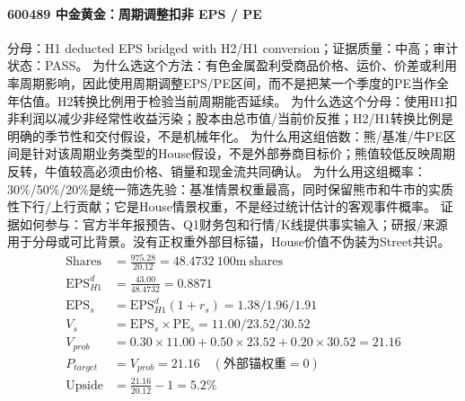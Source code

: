\paragraph{600489 中金黄金：周期调整扣非 EPS / PE}
分母：H1 deducted EPS bridged with H2/H1 conversion；证据质量：中高；审计状态：PASS。
为什么选这个方法：有色金属盈利受商品价格、运价、价差或利用率周期影响，因此使用周期调整EPS/PE区间，而不是把某一个季度的PE当作全年估值。H2转换比例用于检验当前周期能否延续。
为什么选这个分母：使用H1扣非利润以减少非经常性收益污染；股本由总市值/当前价反推；H2/H1转换比例是明确的季节性和交付假设，不是机械年化。
为什么用这组倍数：熊/基准/牛PE区间是针对该周期业务类型的House假设，不是外部券商目标价；熊值较低反映周期反转，牛值较高必须由价格、销量和现金流共同确认。
为什么用这组概率：30\%/50\%/20\%是统一筛选先验：基准情景权重最高，同时保留熊市和牛市的实质性下行/上行贡献；它是House情景权重，不是经过统计估计的客观事件概率。
证据如何参与：官方半年报预告、Q1财务包和行情/K线提供事实输入；研报/来源用于分母或可比背景。没有正权重外部目标锚，House价值不伪装为Street共识。
\begin{align*}
\mathrm{Shares} &= \frac{975.28}{20.12}=48.4732\ \mathrm{100m\ shares}\\
\mathrm{EPS}_{H1}^d &= \frac{43.00}{48.4732}=0.8871\\
\mathrm{EPS}_s &= \mathrm{EPS}_{H1}^d(1+r_s)=1.38/1.96/1.91\\
V_s &= \mathrm{EPS}_s\times \mathrm{PE}_s=11.00/23.52/30.52\\
V_{prob} &= 0.30\times 11.00+0.50\times 23.52+0.20\times 30.52=21.16\\
P_{target} &= V_{prob}=21.16\quad(\text{外部锚权重}=0)\\
\mathrm{Upside} &= \frac{21.16}{20.12}-1=5.2\%\\
\end{align*}

